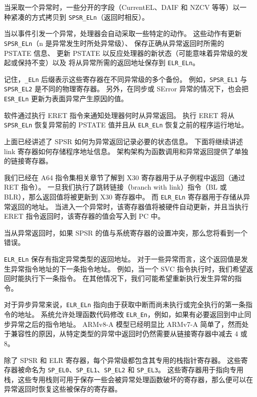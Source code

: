 当采取一个异常时，一些分开的字段（CurrentEL、DAIF 和 NZCV 等等）以一种紧凑的方式拷贝到 \lstinline!SPSR_ELn!（返回时相反）。

当以事件引发一个异常，处理器会自动采取一些特定的动作。
这些动作有更新 \lstinline!SPSR_ELn!（n 是异常发生时所处异常级）、
保存正确从异常返回时所需的 PSTATE 信息、
更新 PSTATE 以反应处理器的新状态（可能意味着异常级的发起或保持不变）以及
将从异常所需的返回地址保存到 \lstinline!ELR_ELn!。


记住，\lstinline!_ELn! 后缀表示这些寄存器在不同异常级的多个备份。
例如，\lstinline!SPSR_EL1! 与 \lstinline!SPSR_EL2! 是不同的物理寄存器。
另外，在同步或 SError 异常的情况下，也会把 \lstinline!ESR_ELn! 更新为表面异常产生原因的值。

软件通过执行 ERET 指令来通知处理器何时从异常返回。
执行 ERET 将从 \lstinline!SPSR_ELn! 恢复异常前的 PSTATE 值并且从 \lstinline!ELR_ELn! 恢复之前的程序运行地址。

上面已经讲述了 SPSR 如何为异常返回记录必要的状态信息。
下面将继续讲述 link 寄存器如何存储程序地址信息。
架构架构为函数调用和异常返回提供了单独的链接寄存器。

我们已经在 A64 指令集相关章节了解到 X30 寄存器用于从子例程中返回（通过 RET 指令）。
一旦我们执行了跳转链接（branch with link）指令（BL 或 BLR），那么返回值将被更新到 X30 寄存器中。
而 \lstinline!ELR_ELn! 寄存器用于存储从异常返回的地址。
当进入一个异常时，该寄存器值将被硬件自动更新，并且当执行 ERET 指令返回时，该寄存器的值会写入到 PC 中。

\begin{Tcbox}[title={Note}]
  当从异常返回时，如果 SPSR 的值与系统寄存器的设置冲突，那么您将看到一个错误。
\end{Tcbox}

\lstinline!ELR_ELn! 保存有指定异常类型的返回地址。
对于一些异常而言，这个返回值是发生异常指令地址的下一条指令地址。
例如，当一个 SVC 指令执行时，我们希望返回时能执行下一条指令。
在其他情况下，我们可能希望重新执行发生异常的指令。

对于异步异常来说，\lstinline!ELR_ELn! 指向由于获取中断而尚未执行或完全执行的第一条指令的地址。
系统允许处理函数代码修改 \lstinline!ELR_En!，例如，如果有必要返回到中止同步异常之后的指令地址。
ARMv8-A 模型已经明显比 ARMv7-A 简单了，然而处于兼容性的原因，从特定类型的异常中返回时仍然需要从链接寄存器中减去 4 或 8。

除了 SPSR 和 ELR 寄存器，每个异常级都包含其专用的栈指针寄存器。
这些寄存器被命名为 \lstinline!SP_EL0!、\lstinline!SP_EL1!、\lstinline!SP_EL2! 和 \lstinline!SP_EL3!。
这些寄存器用于指向专用栈，这些专用栈则可用于保存一些会被异常处理函数破坏的寄存器，那么便可以在异常返回时恢复这些被保存的寄存器。

